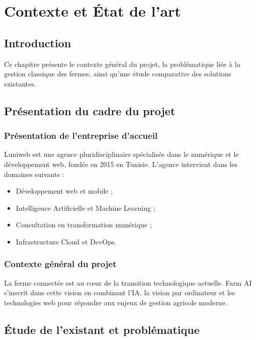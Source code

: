 \documentclass[12pt,a4paper]{report}
\numberwithin{figure}{chapter}
\numberwithin{table}{chapter}
\begin{document}
\chapter{Contexte et État de l'art}

\section{Introduction}
Ce chapitre présente le contexte général du projet, la problématique liée à la gestion classique
des fermes, ainsi qu'une étude comparative des solutions existantes.

\section{Présentation du cadre du projet}

\subsection{Présentation de l'entreprise d'accueil}
Luniweb est une agence pluridisciplinaire spécialisée dans le numérique et le développement web,
fondée en 2015 en Tunisie. L'agence intervient dans les domaines suivants :

\begin{itemize}
  \item Développement web et mobile ;
  \item Intelligence Artificielle et Machine Learning ;
  \item Consultation en transformation numérique ;
  \item Infrastructure Cloud et DevOps.
\end{itemize}

\subsection{Contexte général du projet}
La ferme connectée est au cœur de la transition technologique actuelle. Farm AI s'inscrit dans cette
vision en combinant l'IA, la vision par ordinateur et les technologies web pour répondre aux enjeux
de gestion agricole moderne.

\section{Étude de l'existant et problématique}
\end{document}
